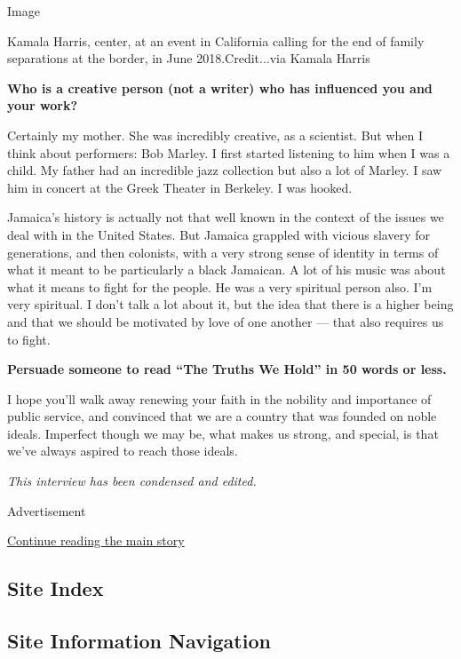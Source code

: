 Image

Kamala Harris, center, at an event in California calling for the end of
family separations at the border, in June 2018.Credit...via Kamala
Harris

\textbf{Who is a creative person (not a writer) who has influenced you
and your work?}

Certainly my mother. She was incredibly creative, as a scientist. But
when I think about performers: Bob Marley. I first started listening to
him when I was a child. My father had an incredible jazz collection but
also a lot of Marley. I saw him in concert at the Greek Theater in
Berkeley. I was hooked.

Jamaica's history is actually not that well known in the context of the
issues we deal with in the United States. But Jamaica grappled with
vicious slavery for generations, and then colonists, with a very strong
sense of identity in terms of what it meant to be particularly a black
Jamaican. A lot of his music was about what it means to fight for the
people. He was a very spiritual person also. I'm very spiritual. I don't
talk a lot about it, but the idea that there is a higher being and that
we should be motivated by love of one another --- that also requires us
to fight.

\textbf{Persuade someone to read ``The Truths We Hold'' in 50 words or
less.}

I hope you'll walk away renewing your faith in the nobility and
importance of public service, and convinced that we are a country that
was founded on noble ideals. Imperfect though we may be, what makes us
strong, and special, is that we've always aspired to reach those ideals.

\emph{This interview has been condensed and edited.}

Advertisement

\protect\hyperlink{after-bottom}{Continue reading the main story}

\hypertarget{site-index}{%
\subsection{Site Index}\label{site-index}}

\hypertarget{site-information-navigation}{%
\subsection{Site Information
Navigation}\label{site-information-navigation}}


